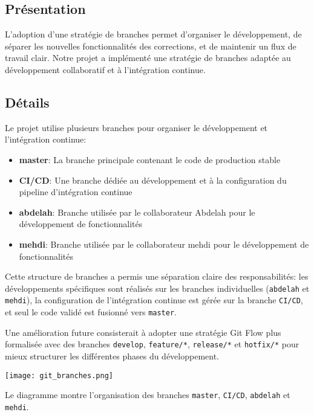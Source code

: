 \subsection{Présentation}
L'adoption d'une stratégie de branches permet d'organiser le développement, de séparer les nouvelles fonctionnalités des corrections, et de maintenir un flux de travail clair. Notre projet a implémenté une stratégie de branches adaptée au développement collaboratif et à l'intégration continue.

\subsection{Détails}
Le projet utilise plusieurs branches pour organiser le développement et l'intégration continue:

\begin{itemize}
  \item \textbf{master}: La branche principale contenant le code de production stable
  \item \textbf{CI/CD}: Une branche dédiée au développement et à la configuration du pipeline d'intégration continue
  \item \textbf{abdelah}: Branche utilisée par le collaborateur Abdelah pour le développement de fonctionnalités
  \item \textbf{mehdi}: Branche utilisée par le collaborateur mehdi pour le développement de fonctionnalités
\end{itemize}

Cette structure de branches a permis une séparation claire des responsabilités: les développements spécifiques sont réalisés sur les branches individuelles (\texttt{abdelah} et \texttt{mehdi}), la configuration de l'intégration continue est gérée sur la branche \texttt{CI/CD}, et seul le code validé est fusionné vers \texttt{master}.

Une amélioration future consisterait à adopter une stratégie Git Flow plus formalisée avec des branches \texttt{develop}, \texttt{feature/*}, \texttt{release/*} et \texttt{hotfix/*} pour mieux structurer les différentes phases du développement.

\begin{center}
\begin{minipage}{\textwidth}
  \begin{tcolorbox}[enhanced, colback=lightgray, colframe=accentblue, arc=5pt, boxrule=0.5pt, drop shadow]
    \centering
    \texttt{[image: git\_branches.png]}
    \label{fig:git-branches}
    \vspace{0.5cm}
    \parbox{0.9\textwidth}{\centering Le diagramme montre l'organisation des branches \texttt{master}, \texttt{CI/CD}, \texttt{abdelah} et \texttt{mehdi}.}
  \end{tcolorbox}
\end{minipage}
\end{center}


